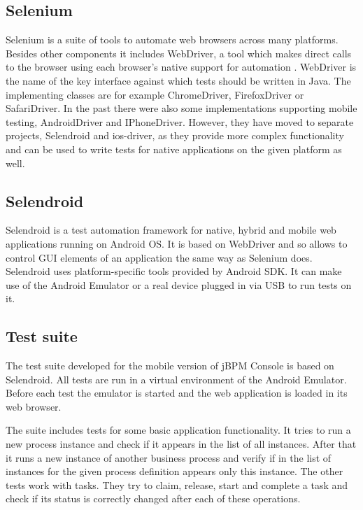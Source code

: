 \documentclass[12pt,oneside,final]{fithesis2}
\begin{document}
\subsection{Selenium}
Selenium is a suite of tools to automate web browsers across many platforms.
Besides other components it includes WebDriver, a tool which makes direct calls to the browser using each browser’s native support for automation \cite{webdriver}.
WebDriver is the name of the key interface against which tests should be written in Java.
The implementing classes are for example ChromeDriver, FirefoxDriver or SafariDriver.
In the past there were also some implementations supporting mobile testing, AndroidDriver and IPhoneDriver.
However, they have moved to separate projects, Selendroid\footnotemark{} and ios-driver\footnotemark{}, as they provide more complex functionality and can be used to write tests for native applications on the given platform as well.

\subsection{Selendroid}
Selendroid is a test automation framework for native, hybrid and mobile web applications running on Android OS.
It is based on WebDriver and so allows to control GUI elements of an application the same way as Selenium does.
Selendroid uses platform-specific tools provided by Android SDK.
It can make use of the Android Emulator or a real device plugged in via USB to run tests on it.

\subsection{Test suite}
The test suite developed for the mobile version of jBPM Console is based on Selendroid.
All tests are run in a virtual environment of the Android Emulator.
Before each test the emulator is started and the web application is loaded in its web browser.

The suite includes tests for some basic application functionality.
It tries to run a new process instance and check if it appears in the list of all instances.
After that it runs a new instance of another business process and verify if in the list of instances for the given process definition appears only this instance.
The other tests work with tasks.
They try to claim, release, start and complete a task and check if its status is correctly changed after each of these operations.
\end{document}
